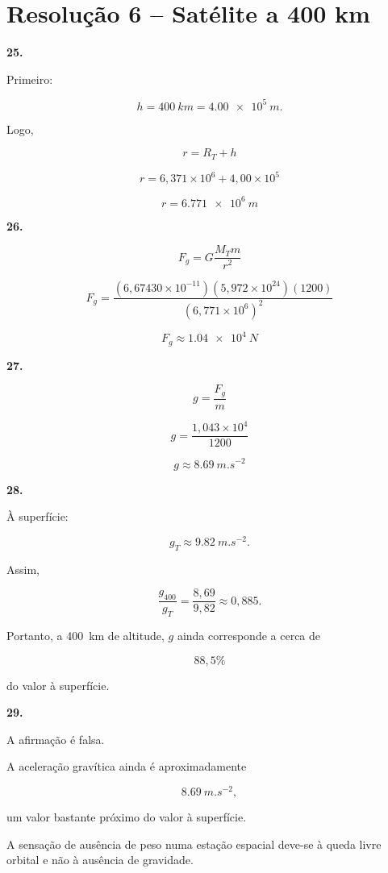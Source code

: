 \documentclass[11pt,a4paper]{article}
\begin{document}
	\section*{Resolução 6 -- Satélite a 400 km}
	
	\begin{solucaobox}[Questões 25--29]
		
		\textbf{25.}
		
		Primeiro:
		
		\[
		h=\SI{400}{km}
		=
		\SI{4.00e5}{m}.
		\]
		
		Logo,
		
		\[
		r=R_T+h
		\]
		
		\[
		r=
		6{,}371\times10^6
		+
		4{,}00\times10^5
		\]
		
		\[
		\boxed{
			r=
			\SI{6.771e6}{m}
		}
		\]
		
		\vspace{3mm}
		
		\textbf{26.}
		
		\[
		F_g=
		G\frac{M_Tm}{r^2}
		\]
		
		\[
		F_g=
		\frac{
			(6{,}67430\times10^{-11})
			(5{,}972\times10^{24})
			(1200)
		}{
			(6{,}771\times10^6)^2
		}
		\]
		
		\[
		\boxed{
			F_g\approx\SI{1.04e4}{N}
		}
		\]
		
		\vspace{3mm}
		
		\textbf{27.}
		
		\[
		g=
		\frac{F_g}{m}
		\]
		
		\[
		g=
		\frac{1{,}043\times10^4}{1200}
		\]
		
		\[
		\boxed{
			g\approx\SI{8.69}{m.s^{-2}}
		}
		\]
		
		\vspace{3mm}
		
		\textbf{28.}
		
		À superfície:
		
		\[
		g_T\approx\SI{9.82}{m.s^{-2}}.
		\]
		
		Assim,
		
		\[
		\frac{g_{400}}{g_T}
		=
		\frac{8{,}69}{9{,}82}
		\approx0{,}885.
		\]
		
		Portanto, a \SI{400}{km} de altitude, $g$ ainda corresponde a cerca de
		
		\[
		\boxed{88{,}5\%}
		\]
		
		do valor à superfície.
		
		\vspace{3mm}
		
		\textbf{29.}
		
		A afirmação é falsa.
		
		A aceleração gravítica ainda é aproximadamente
		
		\[
		\SI{8.69}{m.s^{-2}},
		\]
		
		um valor bastante próximo do valor à superfície.
		
		A sensação de ausência de peso numa estação espacial deve-se à queda
		livre orbital e não à ausência de gravidade.
		
	\end{solucaobox}
	
\end{document}
